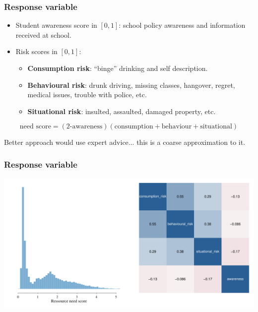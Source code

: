 \documentclass{beamer}
\begin{document}
\begin{frame} \frametitle{Response variable}

\begin{itemize}
  \item Student awareness score in $[0,1]$: school policy awareness and information received at school.
  \item Risk scores in $[0,1]$:
    \begin{itemize}
       \item \textbf{Consumption risk}: ``binge'' drinking and self description.
       \item \textbf{Behavioural risk}: drunk driving, missing classes, hangover, regret, medical issues, trouble with police, etc.
       \item \textbf{Situational risk}: insulted, assaulted, damaged property, etc.
    \end{itemize}
\end{itemize}

$$
  \text{need score} = (\text{2-awareness}) (\text{consumption} + \text{behaviour} + \text{situational})
$$

Better approach would use expert advice... this is a coarse approximation to it.



\end{frame}

\begin{frame} \frametitle{Response variable}

  \begin{center}
    \includegraphics[width=1.05 \linewidth]{Figures/response}
  \end{center}

\end{frame}
\end{document}
